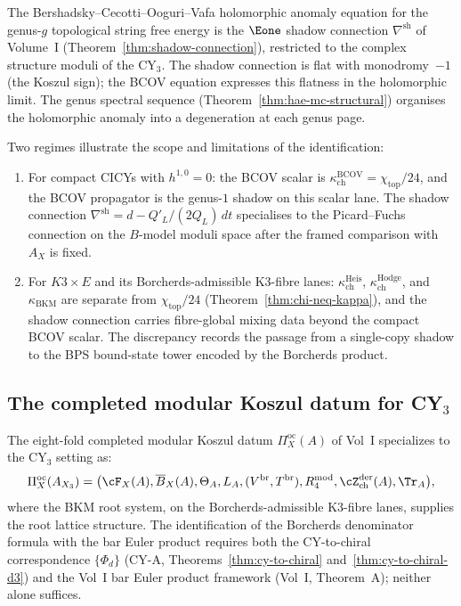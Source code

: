 \begin{remark}
\label{rem:bcov-shadow-connection}
The Bershadsky--Cecotti--Ooguri--Vafa holomorphic anomaly equation for the genus-$g$ topological string free energy is the $\Eone$ shadow connection $\nabla^{\mathrm{sh}}$ of Volume~I (Theorem~\ref{thm:shadow-connection}), restricted to the complex structure moduli of the CY$_3$. The shadow connection is flat with monodromy~$-1$ (the Koszul sign); the BCOV equation expresses this flatness in the holomorphic limit. The genus spectral sequence (Theorem~\ref{thm:hae-mc-structural}) organises the holomorphic anomaly into a degeneration at each genus page.

Two regimes illustrate the scope and limitations of the identification:
\begin{enumerate}[label=\textup{(\roman*)}]
 \item For compact CICYs with $h^{1,0}=0$: the BCOV scalar is $\kappa_{\mathrm{ch}}^{\mathrm{BCOV}}=\chi_{\mathrm{top}}/24$, and the BCOV propagator is the genus-$1$ shadow on this scalar lane. The shadow connection $\nabla^{\mathrm{sh}}=d-Q'_L/(2Q_L)\,dt$ specialises to the Picard--Fuchs connection on the $B$-model moduli space after the framed comparison with $A_X$ is fixed.
 \item For $K3\times E$ and its Borcherds-admissible K3-fibre lanes: $\kappa_{\mathrm{ch}}^{\mathrm{Heis}}$, $\kappa_{\mathrm{ch}}^{\mathrm{Hodge}}$, and $\kappa_{\mathrm{BKM}}$ are separate from $\chi_{\mathrm{top}}/24$ (Theorem~\ref{thm:chi-neq-kappa}), and the shadow connection carries fibre-global mixing data beyond the compact BCOV scalar. The discrepancy records the passage from a single-copy shadow to the BPS bound-state tower encoded by the Borcherds product.
\end{enumerate}
\end{remark}


\subsection{The completed modular Koszul datum for CY\texorpdfstring{$_3$}{-3}}
\label{subsec:cross-vol-mkd}

The eight-fold completed modular Koszul datum $\Pi^{\mathrm{oc}}_X(A)$ of Vol~I specializes to the CY$_3$ setting as:
\[
 \Pi^{\mathrm{oc}}_{X}(A_{X_3}) = \bigl(\cF_X(A), \overline{B}_X(A), \Theta_A, L_A, (V^{\mathrm{br}}, T^{\mathrm{br}}), R^{\mathrm{mod}}_4, \cZ^{\mathrm{der}}_{\mathrm{ch}}(A), \Tr_A\bigr),
\]
where the BKM root system, on the Borcherds-admissible K3-fibre lanes, supplies the root lattice structure. The identification of the Borcherds denominator formula with the bar Euler product requires both the CY-to-chiral correspondence $\{\Phi_d\}$ (CY-A, Theorems~\ref{thm:cy-to-chiral} and~\ref{thm:cy-to-chiral-d3}) and the Vol~I bar Euler product framework (Vol~I, Theorem~A); neither alone suffices.


